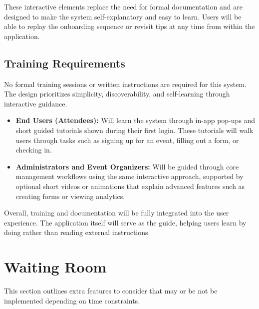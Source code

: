 \documentclass[12pt]{article}
\begin{document}
These interactive elements replace the need for formal documentation and are designed to make the system self-explanatory and easy to learn.
Users will be able to replay the onboarding sequence or revisit tips at any time from within the application.

\subsection{Training Requirements}

No formal training sessions or written instructions are required for this system.
The design prioritizes simplicity, discoverability, and self-learning through interactive guidance.

\begin{itemize}
    \item \textbf{End Users (Attendees):}
    Will learn the system through in-app pop-ups and short guided tutorials shown during their first login.
    These tutorials will walk users through tasks such as signing up for an event, filling out a form, or checking in.

    \item \textbf{Administrators and Event Organizers:}
    Will be guided through core management workflows using the same interactive approach, supported by optional short videos or animations that explain advanced features such as creating forms or viewing analytics.
\end{itemize}

Overall, training and documentation will be fully integrated into the user experience.
The application itself will serve as the guide, helping users learn by doing rather than reading external instructions.


\section{Waiting Room}

This section outlines extra features to consider that may or be not be implemented depending on time constraints.
\end{document}

